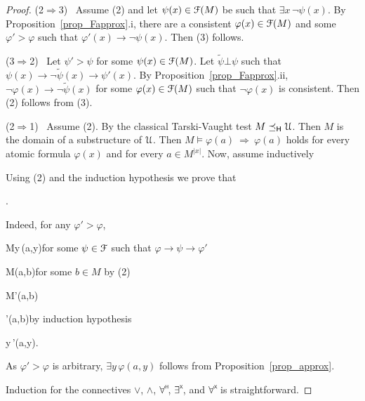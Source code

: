 \documentclass{amsproc}
\begin{document}
{\begin{proof}
  (2$\Rightarrow$3) \ 
  Assume (2) and let $\psi(x)\in{\EuScript F}(M)$ be such that $\exists x\,\neg\psi(x)$.
  By Proposition~\ref{prop_Fapprox}.i, there are a consistent $\varphi(x)\in{\EuScript F}(M)$ and some $\varphi'>\varphi$ such that $\varphi'(x)\rightarrow\neg\psi(x)$.
  Then (3) follows.

  (3$\Rightarrow$2) \ 
  Let $\psi'>\psi$ for some $\psi(x)\in{\EuScript F}(M)$.
  Let $\tilde{\psi}\bot\psi$ such that $\psi(x)\rightarrow\neg\tilde{\psi}(x)\rightarrow\psi'(x)$.
  By Proposition~\ref{prop_Fapprox}.ii, $\neg\varphi(x)\rightarrow\neg\tilde{\psi}(x)$ for some $\varphi(x)\in{\EuScript F}(M)$ such that $\neg\varphi(x)$ is consistent.
  Then (2) follows from (3).
  
  (2$\Rightarrow$1) \ 
  Assume (2).
  By the classical Tarski-Vaught test $M\preceq_{\sf H}{\EuScript U}$.
  Then $M$ is the domain of a substructure of ${\EuScript U}$.
  Then $M\models\varphi(a)\ \Rightarrow\ \varphi(a)$ holds for every atomic formula $\varphi(x)$ and for every $a\in M^{|x|}$.
  Now, assume inductively
  
  \ceq{\hfill M\models\varphi(a,b)}{\Rightarrow}{\varphi(a,b).}

  Using (2) and the induction hypothesis we prove that

  .

  Indeed, for any $\varphi'>\varphi$,

  {\Rightarrow}{M\models\exists y\,\psi(a,y)}\hfill for some $\psi\in{\EuScript F}$ such that $\varphi\rightarrow\psi\rightarrow\varphi'$
  
  \ceq{}
  {\Rightarrow}
  {M\models\psi(a,b)}\hfill for some $b\in M$ by (2)
  
  \ceq{}
  {\Rightarrow}
  {M\models\varphi'(a,b)}
  
  \ceq{}
  {\Rightarrow}
  {\varphi'(a,b)}\hfill by induction hypothesis

  \ceq{}
  {\Rightarrow}
  {\exists y\,\varphi'(a,y).}

  As $\varphi'>\varphi$ is arbitrary, $\exists y\,\varphi(a,y)$ follows from Proposition~\ref{prop_approx}.

  Induction for the connectives $\vee$, $\wedge$, $\forall\raisebox{1.1ex}{\scaleto{\sf H}{.8ex}\kern-.2ex}$, $\exists\raisebox{1.1ex}{\scaleto{\sf X}{.8ex}\kern-.2ex}$, and $\forall\raisebox{1.1ex}{\scaleto{\sf X}{.8ex}\kern-.2ex}$ is straightforward.


\end{proof}}
\end{document}
